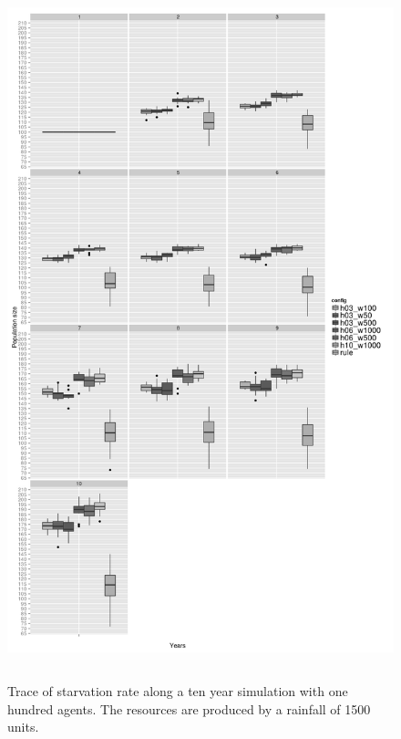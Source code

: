 \documentclass[11pt,oneside,a4paper,openright]{report}
\begin{document}
\begin{figure}[!htb]
\centering
\includegraphics[height=20.2cm]{figures/expm/popClim1500_BW}
\caption{Trace of starvation rate along a ten year simulation with one hundred agents. The resources are produced by a rainfall of 1500 units.}
\label{fig:popClim1500_BW}
\end{figure}
\end{document}
